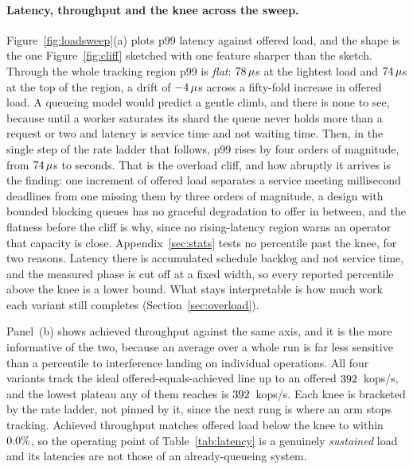 \documentclass[english,oneside,a4paper,censored,csm,software-track-2020]{HYthesisML}
\begin{document}
\paragraph{Latency, throughput and the knee across the sweep.}
Figure~\ref{fig:loadsweep}(a) plots p99 latency against offered load, and the shape is the one
Figure~\ref{fig:cliff} sketched with one feature sharper than the sketch. Through the whole
tracking region p99 is \emph{flat}: $78\,\mu$s at the lightest load and
$74\,\mu$s at the top of the region, a drift of
$-4\,\mu$s across a fifty-fold increase in offered load. A queueing model
would predict a gentle climb, and there is none to see, because until a worker saturates its shard
the queue never holds more than a request or two and latency is service time and not waiting
time. Then, in the single step of the rate ladder that follows, p99 rises by four orders of
magnitude, from $74\,\mu$s to seconds. That is the overload cliff, and how
abruptly it arrives is the finding: one increment of offered load separates a service meeting
millisecond deadlines from one missing them by three orders of magnitude, a design with bounded
blocking queues has no graceful degradation to offer in between, and the flatness before the cliff
is why, since no rising-latency region warns an operator that capacity is close.
Appendix~\ref{sec:stats} tests no percentile past the knee, for two reasons. Latency there is
accumulated schedule backlog and not service time, and the measured phase is cut off at a fixed
width, so every reported percentile above the knee is a lower bound. What stays interpretable is
how much work each variant still completes (Section~\ref{sec:overload}).

Panel~(b) shows achieved throughput against the same axis, and it is the more informative of the
two, because an average over a whole run is far less sensitive than a percentile to interference
landing on individual operations. All four variants track the ideal offered-equals-achieved line
up to an offered $392$~kops/s, and the lowest plateau any of them reaches is
$392$~kops/s. Each knee is bracketed by the rate ladder, not pinned by it, since the
next rung is where an arm stops tracking. Achieved throughput matches offered load below the knee
to within $0.0\%$, so the operating point of Table~\ref{tab:latency} is a genuinely
\emph{sustained} load and its latencies are not those of an already-queueing system.
\end{document}
